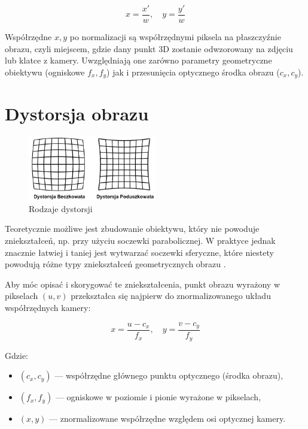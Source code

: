 \documentclass[magisterska]{pracadypl}
\begin{document}
\[
x = \frac{x'}{w}, \quad y = \frac{y'}{w}
\]

Współrzędne \( x, y \) po normalizacji są współrzędnymi piksela na płaszczyźnie obrazu, czyli miejscem, gdzie dany punkt 3D zostanie odwzorowany na zdjęciu lub klatce z kamery. Uwzględniają one zarówno parametry geometryczne obiektywu (ogniskowe \( f_x, f_y \)) jak i przesunięcia optycznego środka obrazu (\( c_x, c_y \)).

\section{Dystorsja obrazu}

\begin{figure}[H]  %
    \centering  %
    \includegraphics[width=0.5\textwidth]{images/dystorsje.png}  %
    \captionsetup{font=footnotesize}
    \caption[Rodzaje dystorsji. https://beafoto.pl/dystorsja]{Rodzaje dystorsji}
    \label{fig:rpi}  %
\end{figure}

Teoretycznie możliwe jest zbudowanie obiektywu, który nie powoduje zniekształceń, np. przy użyciu soczewki parabolicznej. W praktyce jednak znacznie łatwiej i taniej jest wytwarzać soczewki sferyczne, które niestety powodują różne typy zniekształceń geometrycznych obrazu \cite{dystorsja}.

Aby móc opisać i skorygować te zniekształcenia, punkt obrazu wyrażony w pikselach \( (u, v) \) przekształca się najpierw do znormalizowanego układu współrzędnych kamery:

\[
x = \frac{u - c_x}{f_x}, \quad y = \frac{v - c_y}{f_y}
\]

Gdzie:
\begin{itemize}
    \item \( (c_x, c_y) \) — współrzędne głównego punktu optycznego (środka obrazu),
    \item \( (f_x, f_y) \) — ogniskowe w poziomie i pionie wyrażone w pikselach,
    \item \( (x, y) \) — znormalizowane współrzędne względem osi optycznej kamery.
\end{itemize}
\end{document}
